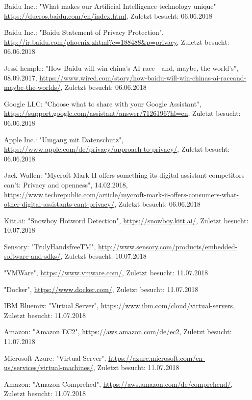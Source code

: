 \documentclass[journal]{IEEEtran}
\begin{document}
\begin{thebibliography}{1}
Baidu Inc.: "What makes our Artificial Intelligence technology unique"  \url{https://dueros.baidu.com/en/index.html},
Zuletzt besucht: 06.06.2018

Baidu Inc.: "Baidu Statement of Privacy Protection", \url{http://ir.baidu.com/phoenix.zhtml?c=188488\&p=privacy},
Zuletzt besucht: 06.06.2018


Jessi hemple: "How Baidu will win china's AI race - and, maybe, the world's", 08.09.2017, \url{https://www.wired.com/story/how-baidu-will-win-chinas-ai-raceand-maybe-the-worlds/},
Zuletzt besucht: 06.06.2018

Google LLC: "Choose what to share with your Google Assistant", \url{https://support.google.com/assistant/answer/7126196?hl=en},
Zuletzt besucht: 06.06.2018

Apple Inc.: "Umgang mit Datenschutz", \url{https://www.apple.com/de/privacy/approach-to-privacy/},
Zuletzt besucht: 06.06.2018

Jack Wallen: "Mycroft Mark II offers something its digital assistant competitors can't: Privacy and openness", 14.02.2018, \url{https://www.techrepublic.com/article/mycroft-mark-ii-offers-consumers-what-other-digital-assistants-cant-privacy/},
Zuletzt besucht: 06.06.2018	
	
Kitt.ai: "Snowboy Hotword Detection",
\url{https://snowboy.kitt.ai/},
Zuletzt besucht: 10.07.2018

Sensory: "TrulyHandsfreeTM",
\url{http://www.sensory.com/products/embedded-software-and-sdks/},
Zuletzt besucht: 10.07.2018

"VMWare",
\url{https://www.vmware.com/},
Zuletzt besucht: 11.07.2018

"Docker",
\url{https://www.docker.com/},
Zuletzt besucht: 11.07.2018

IBM Bluemix: "Virtual Server",
\url{https://www.ibm.com/cloud/virtual-servers},
Zuletzt besucht: 11.07.2018

Amazon: "Amazon EC2",
\url{https://aws.amazon.com/de/ec2},
Zuletzt besucht: 11.07.2018

Microsoft Azure: "Virtual Server",
\url{https://azure.microsoft.com/en-us/services/virtual-machines/},
Zuletzt besucht: 11.07.2018

Amazon: "Amazon Comprehed",
\url{https://aws.amazon.com/de/comprehend/},
Zuletzt besucht: 11.07.2018


\end{thebibliography}
\end{document}
